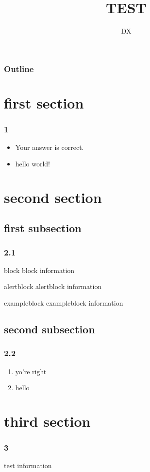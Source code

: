 \documentclass{beamer}
\begin{document}
\title{TEST}
\author{DX}
\begin{frame}
  \titlepage
\end{frame}

\begin{frame}
  \frametitle{Outline}
  \tableofcontents %
\end{frame}

\section{first section}
\begin{frame}
  \frametitle{1}
  \begin{itemize}
    \item Your answer is correct.
    \item hello world!
  \end{itemize}
\end{frame}

\section{second section}
\subsection{first subsection}
\begin{frame}
  \frametitle{2.1}
  \begin{block}{block}
    block information
  \end{block}
  \begin{alertblock}{alertblock}
    alertblock information
  \end{alertblock}
  \begin{exampleblock}{exampleblock}
    exampleblock information
  \end{exampleblock}
\end{frame}

\subsection{second subsection}
\begin{frame}
  \frametitle{2.2}
  \begin{enumerate}
    \item yo're right
    \item hello
  \end{enumerate}
\end{frame}

\section{third section}
\begin{frame}
  \frametitle{3}
  test information
\end{frame}
\end{document}

